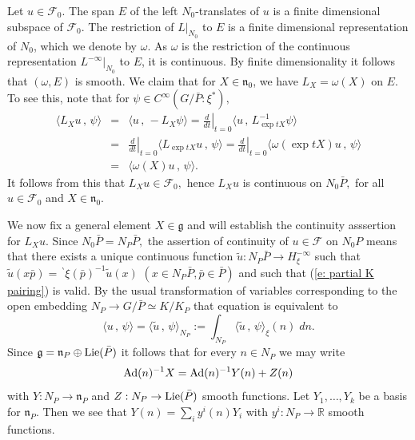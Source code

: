 \documentclass[12pt,a4paper]{article}
\def\msy#1{{\mathbb #1}}
\def\R{{\msy R}}
\def\got#1{\mathfrak #1}
\def\fg{{\got g}}
\def\fn{{\got n}}
\def\to{\rightarrow}
\def\inp#1#2{\langle#1\,,\,#2\rangle}
\def\Ad{{\rm Ad}}
\def\cF{{\mathcal F}}
\numberwithin{Thm}{section}
\numberwithin{equation}{section}
\numberwithin{equation}{section}
\def\bp{\!{\,}^\backprime}
\begin{document}
Let $u\in \cF_0.$ The span  $E$
of the left $N_0$-translates of $u$ is a finite dimensional subspace of $\cF_0.$ 
The restriction of $L|_{N_0}$ to $E$ is a finite dimensional
representation of $N_0$, which we denote by $\omega.$ As $\omega$ is the restriction
of the continuous representation $L^{-\infty}|_{N_0}$ to $E$, it is continuous. By finite 
dimensionality it follows that $(\omega, E)$ is smooth.
We claim that for $X \in \fn_0$, we have 
$L_X = \omega(X)$ on $E.$ To see this, note that for $\psi \in C^\infty(G/\bar P: \xi^*),$
\begin{eqnarray*}
\inp{L_X u}{\psi}
&=& \inp{u}{- L_X \psi} 
=
\left. \frac{d}{dt}\right|_{t=0} \inp{u}{L_{\exp tX}^{-1} \psi }\\
&=& 
\left. \frac{d}{dt}\right|_{t=0} \inp{L_{\exp tX}u}{\psi} 
 =   \left. \frac{d}{dt}\right|_{t=0} \inp{\omega(\exp tX)u}{\psi}\\
&=& \inp{\omega(X) u}{\psi}.
\end{eqnarray*} 
It follows from this that $L_X u \in \cF_0,$ hence $L_X u$ is continuous on $N_0\bar P,$ 
for all $u \in \cF_0$ and $X \in \fn_0.$ 

We now fix a general element $X \in \fg$ and will establish the continuity asssertion
for $L_X u.$ Since  $N_0 \bar P = N_P \bar P,$ 
the assertion of continuity of $u \in \cF$ on $N_0 P$  means that there exists
a unique continuous function $\tilde u : N_P\bar P \to H_\xi^{-\infty}$ 
such that $\tilde u(x\bar p) = \bp\xi(\bar p)^{-1} \tilde u(x)$ $(x \in N_P\bar P, \bar p \in \bar P)$
and such that
(\ref{e: partial K pairing}) is valid. By the usual transformation of variables corresponding
to the open embedding $N_P \to G/\bar P\simeq K/K_P$ that equation is equivalent
to 
$$ 
\inp{u}{\psi}= \inp{\tilde u}{\psi}_{N_P}:= \int_{N_P} \inp{\tilde u}{\psi}_\xi (n) \; dn.
$$ 
Since $\fg = \fn_P \oplus {\rm Lie}(\bar P)$ it follows  
that for every $n\in N_P$ we may 
write 
$$
\Ad(n)^{-1} X = \Ad(n)^{-1}  Y(n) + Z(n)
$$  with $Y: N_P \to \fn_P$ and $Z: N_P \to {\rm Lie}(\bar P)$ smooth functions.
Let $Y_1, \ldots, Y_k$ be a basis for $\fn_P.$ 
Then we see that $Y(n) = \sum_i y^i(n) Y_i$  with $y^i: N_P \to \R$ smooth functions.
\end{document}
